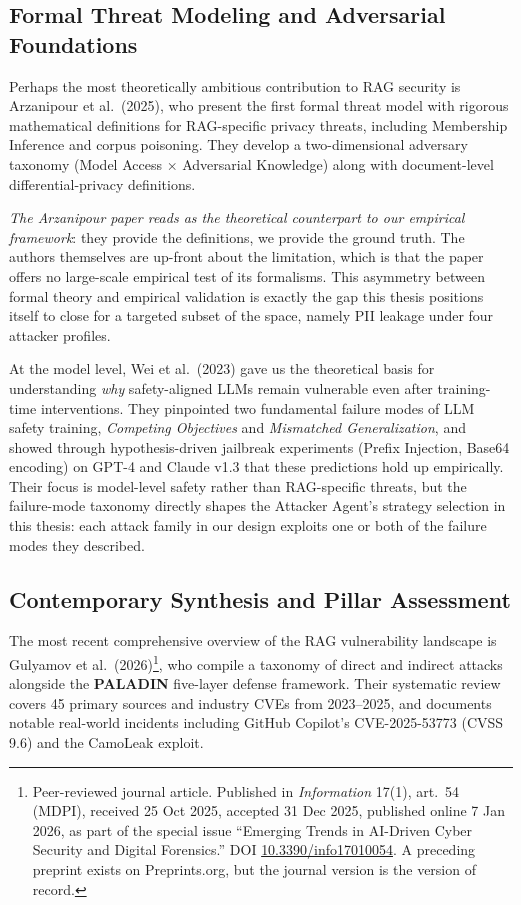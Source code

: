 \documentclass[12pt,a4paper]{report}
\begin{document}
\subsection{Formal Threat Modeling and Adversarial Foundations}

Perhaps the most theoretically ambitious contribution to RAG security is Arzanipour et al.\ (2025), who present the first formal threat model with rigorous mathematical definitions for RAG-specific privacy threats, including Membership Inference and corpus poisoning. They develop a two-dimensional adversary taxonomy (Model Access $\times$ Adversarial Knowledge) along with document-level differential-privacy definitions.

\begin{critbox}
\textit{The Arzanipour paper reads as the theoretical counterpart to our empirical framework}: they provide the definitions, we provide the ground truth. The authors themselves are up-front about the limitation, which is that the paper offers no large-scale empirical test of its formalisms. This asymmetry between formal theory and empirical validation is exactly the gap this thesis positions itself to close for a targeted subset of the space, namely PII leakage under four attacker profiles.
\end{critbox}

At the model level, Wei et al.\ (2023) gave us the theoretical basis for understanding \emph{why} safety-aligned LLMs remain vulnerable even after training-time interventions. They pinpointed two fundamental failure modes of LLM safety training, \emph{Competing Objectives} and \emph{Mismatched Generalization}, and showed through hypothesis-driven jailbreak experiments (Prefix Injection, Base64 encoding) on GPT-4 and Claude v1.3 that these predictions hold up empirically. Their focus is model-level safety rather than RAG-specific threats, but the failure-mode taxonomy directly shapes the Attacker Agent's strategy selection in this thesis: each attack family in our design exploits one or both of the failure modes they described.

\subsection{Contemporary Synthesis and Pillar Assessment}

The most recent comprehensive overview of the RAG vulnerability landscape is Gulyamov et al.\ (2026)\footnote{Peer-reviewed journal article. Published in \emph{Information} 17(1), art.~54 (MDPI), received 25 Oct 2025, accepted 31 Dec 2025, published online 7 Jan 2026, as part of the special issue ``Emerging Trends in AI-Driven Cyber Security and Digital Forensics.'' DOI \href{https://doi.org/10.3390/info17010054}{10.3390/info17010054}. A preceding preprint exists on Preprints.org, but the journal version is the version of record.}, who compile a taxonomy of direct and indirect attacks alongside the \textbf{PALADIN} five-layer defense framework. Their systematic review covers 45 primary sources and industry CVEs from 2023--2025, and documents notable real-world incidents including GitHub Copilot's CVE-2025-53773 (CVSS 9.6) and the CamoLeak exploit.
\end{document}
